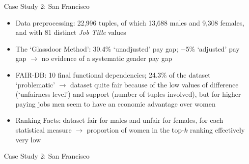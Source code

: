 \documentclass[usenames,dvipsnames]{beamer}
\begin{document}
    
    \begin{frame}{Case Study 2: San Francisco}
        \begin{itemize}
            \item \textcolor{defaultBlue}{Data preprocessing}: 22,996 tuples, of which 13,688 males and 9,308 females, and with 81 distinct \textit{Job Title} values\newline
            \item \textcolor{defaultBlue}{The `Glassdoor Method'}: 30.4\% `unadjusted' pay gap; \(-\)5\% `adjusted' pay gap $\rightarrow$ no evidence of a systematic gender pay gap
            \item \textcolor{defaultBlue}{FAIR-DB}: 10 final functional dependencies; 24.3\% of the dataset `problematic' $\rightarrow$ dataset quite fair because of the low values of {difference} (`unfairness level') and {support} (number of tuples involved), but for higher-paying jobs men seem to have an economic advantage over women
            \item \textcolor{defaultBlue}{Ranking Facts}: dataset fair for males and unfair for females, for each statistical measure $\rightarrow$ proportion of women in the top-\(k\) ranking effectively very low
        \end{itemize}
    \end{frame}
    
    
    \begin{frame}{Case Study 2: San Francisco}
        \begin{figure}
            \medskip\centering
            \hfill
        \end{figure}
    \end{frame}
    
\end{document}
